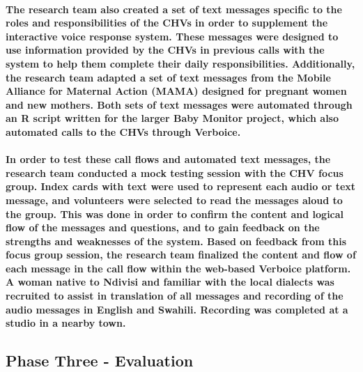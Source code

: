\paragraph{The research team also created a set of text messages specific to the roles and responsibilities of the CHVs in order to supplement the interactive voice response system. These messages were designed to use information provided by the CHVs in previous calls with the system to help them complete their daily responsibilities. Additionally, the research team adapted a set of text messages from the Mobile Alliance for Maternal Action (MAMA) designed for pregnant women and new mothers. Both sets of text messages were automated through an R script written for the larger Baby Monitor project, which also automated calls to the CHVs through Verboice.}

\paragraph{In order to test these call flows and automated text messages, the research team conducted a mock testing session with the CHV focus group. Index cards with text were used to represent each audio or text message, and volunteers were selected to read the messages aloud to the group. This was done in order to confirm the content and logical flow of the messages and questions, and to gain feedback on the strengths and weaknesses of the system. Based on feedback from this focus group session, the research team finalized the content and flow of each message in the call flow within the web-based Verboice platform. A woman native to Ndivisi and familiar with the local dialects was recruited to assist in translation of all messages and recording of the audio messages in English and Swahili. Recording was completed at a studio in a nearby town.}


\subsection{Phase Three - Evaluation}
